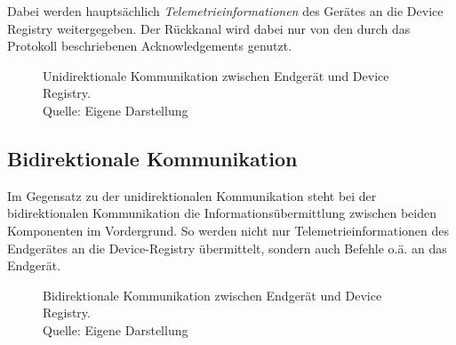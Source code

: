 Dabei werden hauptsächlich \textit{Telemetrieinformationen} des Gerätes an die Device Registry weitergegeben. Der Rückkanal wird dabei nur von den durch das Protokoll beschriebenen Acknowledgements genutzt.

\begin{figure}[h]
    \centering
    \caption[Unidirektionale Kommunikation]{Unidirektionale Kommunikation zwischen Endgerät und Device Registry.\\Quelle: Eigene Darstellung}
\end{figure}

\subsection*{Bidirektionale Kommunikation}
Im Gegensatz zu der unidirektionalen Kommunikation steht bei der bidirektionalen Kommunikation die Informationsübermittlung zwischen beiden Komponenten im Vordergrund. So werden nicht nur Telemetrieinformationen des Endgerätes an die Device-Registry übermittelt, sondern auch Befehle o.ä. an das Endgerät.

\begin{figure}[h]
    \centering
    \caption[Bidirektionale Kommunikation]{Bidirektionale Kommunikation zwischen Endgerät und Device Registry.\\Quelle: Eigene Darstellung}
\end{figure}

